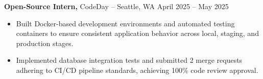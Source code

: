 \documentclass[11pt]{article}       %
\begin{document}
\textbf{Open-Source Intern,} {CodeDay} -- Seattle, WA \hfill April 2025 -- May 2025 \\
\vspace{-9pt}
\begin{itemize}
  \item Built Docker-based development environments and automated testing containers to ensure consistent application behavior across local, staging, and production stages.
  \item Implemented database integration tests and submitted 2 merge requests adhering to CI/CD pipeline standards, achieving 100\% code review approval.
\end{itemize}

\end{document}
